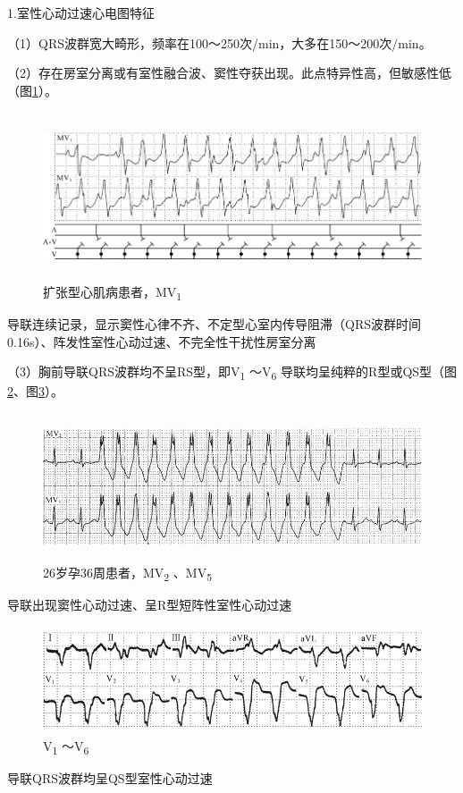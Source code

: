 1.室性心动过速心电图特征

（1）QRS波群宽大畸形，频率在100～250次/min，大多在150～200次/min。

（2）存在房室分离或有室性融合波、窦性夺获出现。此点特异性高，但敏感性低（图\ref{fig31-1}）。

\begin{figure}[!htbp]
 \centering
 \includegraphics[width=5.80208in,height=1.94792in]{./images/Image00504.jpg}
 \captionsetup{justification=centering}
 \caption{扩张型心肌病患者，MV\textsubscript{1}}
 \label{fig31-1}
  \end{figure} 
导联连续记录，显示窦性心律不齐、不定型心室内传导阻滞（QRS波群时间0.16s）、阵发性室性心动过速、不完全性干扰性房室分离

（3）胸前导联QRS波群均不呈RS型，即V\textsubscript{1}
～V\textsubscript{6} 导联均呈纯粹的R型或QS型（图\ref{fig31-2}、图\ref{fig31-3}）。

\begin{figure}[!htbp]
 \centering
 \includegraphics[width=5.58333in,height=1.70833in]{./images/Image00505.jpg}
 \captionsetup{justification=centering}
 \caption{26岁孕36周患者，MV\textsubscript{2} 、MV\textsubscript{5}}
 \label{fig31-2}
  \end{figure} 
导联出现窦性心动过速、呈R型短阵性室性心动过速

\begin{figure}[!htbp]
 \centering
 \includegraphics[width=5in,height=1.25in]{./images/Image00506.jpg}
 \captionsetup{justification=centering}
 \caption{V\textsubscript{1} ～V\textsubscript{6}}
 \label{fig31-3}
  \end{figure} 
导联QRS波群均呈QS型室性心动过速


